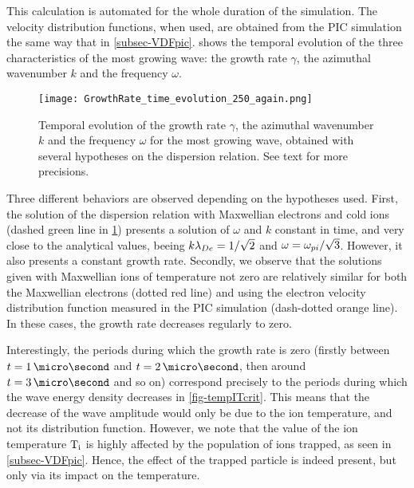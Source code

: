   
  This calculation is automated for the whole duration of the simulation.
  The velocity distribution functions, when used, are obtained from the \ac{PIC} simulation the same way that in \cref{subsec-VDFpic}.
   shows the temporal evolution of the three characteristics of the most growing wave: the growth rate $\gamma$, the azimuthal wavenumber $k$ and the frequency $\omega$.
  \begin{figure}[hbt]
    \centering
    \texttt{[image: GrowthRate\_time\_evolution\_250\_again.png]}  %
    \caption{Temporal evolution of the growth rate $\gamma$, the azimuthal wavenumber $k$ and the frequency $\omega$ for the most growing wave, obtained with several hypotheses on the dispersion relation. See text for more precisions. }
    \label{fig-time_wave}
  \end{figure}
  
  Three different behaviors are observed depending on the hypotheses used.
  First, the solution of the dispersion relation with Maxwellian electrons and cold ions (dashed green line in \cref{fig-time_wave}) presents a solution of $\omega$ and $k$ constant in time, and very close to the analytical values, beeing $k \lambda_{De} = 1/\sqrt{2}$ and $\omega = \omega_{pi}/\sqrt{3}$.
  However, it also presents a constant growth rate.
  Secondly, we observe that the solutions given with Maxwellian ions of temperature not zero are relatively similar for both the Maxwellian electrons  (dotted red line) and using the electron velocity distribution function measured in the \ac{PIC} simulation (dash-dotted orange line).
  In these cases, the growth rate decreases regularly to zero.
  
  Interestingly, the periods during which the growth rate is zero (firstly between $t=1\,\micro\second$ and $t=2\,\micro\second$, then around $t=3\,\micro\second$ and so on) correspond precisely to the periods during which the wave energy density decreases in \cref{fig-tempITcrit}.
  This means that the decrease of the wave amplitude would only be due to the ion temperature, and not its distribution function.
  However, we note that the value of the ion temperature $\mathrm{T_i}$ is highly affected by the population of ions trapped, as seen in \cref{subsec-VDFpic}.
  Hence, the effect of the trapped particle is indeed present, but only via its impact on the temperature.
  
